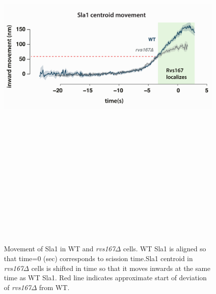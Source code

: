 	\begin{figure}[H]
		\centering
		\hspace{-1cm}
		\includegraphics[width=15cm,height=20cm, keepaspectratio]{figures/results_final/rvsdeletion3}
		\caption[Coat movement in \textit{rvs167$\Delta$} cells]
		{Movement of Sla1 in WT and  \textit{rvs167$\Delta$} cells. WT Sla1 is aligned so that time=0 (sec) corresponds to scission time.Sla1 centroid  in \textit{rvs167$\Delta$} cells is shifted in time so that it moves inwards at the same time as WT Sla1. Red line indicates approximate start of deviation of \textit{rvs167$\Delta$} from WT. 
			\label{fig2_rvsdelta}
		}
	\end{figure}




